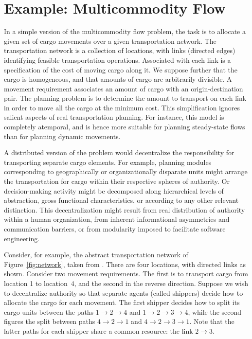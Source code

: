 \section{Example: Multicommodity Flow}

In a simple version of the multicommodity flow problem, the task is
to allocate a given set of cargo movements over a given transportation
network. The transportation network is a collection of locations, with
links (directed edges) identifying feasible transportation operations.
Associated with each link is a specification of the cost of moving cargo
along it.
We suppose further that the cargo is homogeneous, and that
amounts of cargo are arbitrarily divisible.  A movement requirement 
associates an amount of cargo with an origin-destination pair.
The planning problem is to determine the amount to transport on each link
in order to move all the cargo at the minimum cost.  This 
simplification ignores salient aspects of real transportation planning.
For instance, this model is completely atemporal, and is hence 
more suitable for planning steady-state flows than for planning dynamic 
movements.

A distributed version of the problem would decentralize the responsibility for
transporting separate cargo elements.
For example, planning modules corresponding to geographically or
organizationally disparate units might arrange the transportation for cargo
within their respective spheres of authority.
Or decision-making activity might be decomposed along hierarchical levels
of abstraction, gross functional characteristics, or according to any other relevant
distinction.
This decentralization might result from real distribution of authority
within a human organization, from inherent informational asymmetries and 
communication barriers, or from modularity imposed to facilitate software 
engineering.

Consider, for example, the abstract transportation network of
Figure~\ref{fig:network}, taken from .
There are four locations, with directed links as
shown. Consider two movement requirements.
The first is to transport cargo from location 1 to location~4, and the second
in the reverse direction. Suppose we wish to
decentralize authority so that separate agents (called shippers) decide how
to allocate the cargo for each movement.
The first shipper decides how to split its cargo units between the paths
$1\rightarrow2\rightarrow4$ and $1\rightarrow2\rightarrow3\rightarrow4$,
while the second figures the split between paths
$4\rightarrow2\rightarrow1$ and $4\rightarrow2\rightarrow3\rightarrow1$.
Note that the latter paths for each shipper share a common resource: the
link $2\rightarrow3$.

